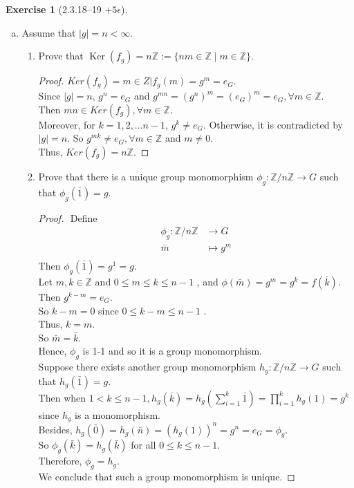 \documentclass{amsart}
\newcommand{\bbz}{\mathbb{Z}}
\renewcommand{\ker}{\operatorname{Ker}}
\theoremstyle{plain}
\theoremstyle{definition}
\newtheorem{exer}[lem]{Exercise}
\begin{document}
\begin{exer}[2.3.18--19 $+5\epsilon$]
\begin{enumerate}[(a)]
\item Assume that $|g|=n<\infty$.
\begin{enumerate}[(1)]
\item Prove that $\ker(f_g)=n\bbz:=\{nm\in\bbz\mid m\in\bbz\}$.
	\begin{proof}
		$Ker(f_g) = {m \in Z | f_g(m) = g^m = e_G}$.\\
		Since $|g| = n$, $g^n = e_G$ and $g^{mn} =(g^n)^m = (e_G)^m = e_G, \forall m \in \bbz$. \\
		Then $mn \in Ker(f_g), \forall m \in \bbz$.\\
		Moreover, for $k = 1,2,...n-1$, $g^k \neq e_G$. Otherwise, it is contradicted by $|g| = n$. So $g^{mk} \neq e_G, \forall m\in \bbz$ and $m\neq 0$.\\
		Thus, $Ker(f_g) = n\bbz$.
	\end{proof}
\item Prove that 
there is a unique group monomorphism $\phi_g\colon\bbz/n\bbz\to G$ such that $\phi_g(\overline 1)=g$. 
\begin{proof}
	$ $\newline
	Define
	\begin{align*}
		\phi_g:\bbz / n \bbz & \to G \\
		\bar{m} & \mapsto g^{m} \\
	\end{align*}
	Then $\phi_g(\bar{1}) = g^{1} = g$. \\
	Let $m,k \in \bbz$ and $0 \leq m \leq k \leq n-1$ , and $\phi(\bar{m}) = g^{m} = g^{k} = f(\bar{k})$.\\
	Then $g^{k-m} = e_G$. \\
	So $k - m = 0$ since $0 \leq k-m \leq n-1$ . \\
	Thus, $k = m$. \\
	So $\bar{m} = \bar{k}$. \\ 
	Hence, $\phi_g$ is 1-1 and so it is a group monomorphism. \\ 
	Suppose there exists another group monomorphism $h_g\colon\bbz/n\bbz\to G$ such that $h_g(\bar{1}) = g$.\\
	Then when $1 < k \leq n-1, h_g(\bar{k}) = h_g(\sum_{i=1}^k \bar{1}) = \prod_{i=1}^k h_g(1) = g^k$ since $h_g$ is a monomorphism.\\
	Besides, $h_g(\bar{0}) = h_g(\bar{n}) = (h_g(1))^n = g^n = e_G = \phi_g$.\\
	So $\phi_g(\bar{k}) = h_g(\bar{k})$ for all $0 \leq k \leq n-1$.\\
	Therefore, $\phi_g = h_g$.\\
	We conclude that such a group monomorphism is unique.
\end{proof}


\end{enumerate}
\end{enumerate}
\end{exer}
\end{document}
